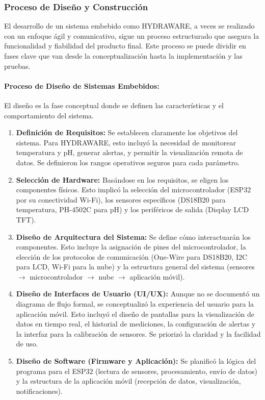 \documentclass[a4paper,12pt]{article}
\begin{document}
	\subsubsection{Proceso de Diseño y Construcción}
	El desarrollo de un sistema embebido como HYDRAWARE, a veces se realizado con un enfoque ágil y comunicativo, sigue un proceso estructurado que asegura la funcionalidad y fiabilidad del producto final. Este proceso se puede dividir en fases clave que van desde la conceptualización hasta la implementación y las pruebas.
	
	\paragraph{Proceso de Diseño de Sistemas Embebidos:}
	El diseño es la fase conceptual donde se definen las características y el comportamiento del sistema.
	\begin{enumerate}
		\item \textbf{Definición de Requisitos:} Se establecen claramente los objetivos del sistema. Para HYDRAWARE, esto incluyó la necesidad de monitorear temperatura y pH, generar alertas, y permitir la visualización remota de datos. Se definieron los rangos operativos seguros para cada parámetro.
		\item \textbf{Selección de Hardware:} Basándose en los requisitos, se eligen los componentes físicos. Esto implicó la selección del microcontrolador (ESP32 por su conectividad Wi-Fi), los sensores específicos (DS18B20 para temperatura, PH-4502C para pH) y los periféricos de salida (Display LCD TFT).
		\item \textbf{Diseño de Arquitectura del Sistema:} Se define cómo interactuarán los componentes. Esto incluye la asignación de pines del microcontrolador, la elección de los protocolos de comunicación (One-Wire para DS18B20, I2C para LCD, Wi-Fi para la nube) y la estructura general del sistema (sensores $\rightarrow$ microcontrolador $\rightarrow$ nube $\rightarrow$ aplicación móvil).
		\item \textbf{Diseño de Interfaces de Usuario (UI/UX):} Aunque no se documentó un diagrama de flujo formal, se conceptualizó la experiencia del usuario para la aplicación móvil. Esto incluyó el diseño de pantallas para la visualización de datos en tiempo real, el historial de mediciones, la configuración de alertas y la interfaz para la calibración de sensores. Se priorizó la claridad y la facilidad de uso.
		\item \textbf{Diseño de Software (Firmware y Aplicación):} Se planificó la lógica del programa para el ESP32 (lectura de sensores, procesamiento, envío de datos) y la estructura de la aplicación móvil (recepción de datos, visualización, notificaciones).
	\end{enumerate}
	
\end{document}
